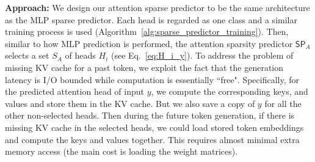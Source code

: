 \textbf{Approach:} We design our attention sparse predictor to be the same architecture as the MLP sparse predictor. Each head is regarded as one class and a similar training process is used (Algorithm~\ref{alg:sparse_predictor_training}). Then, similar to how MLP prediction is performed, the attention sparsity predictor $\mathsf{SP}_A$ selects a set $S_A$ of heads $H_i$ (see Eq.~\eqref{eq:H_i_y}).  To address the problem of missing KV cache for a past token, we exploit the fact that the generation latency is I/O bounded while computation is essentially ``free". Specifically, for the predicted attention head of input $y$, we compute the corresponding keys, and values and store them in the KV cache. But we also save a copy of $y$ for all the other non-selected heads. Then during the future token generation, if there is missing KV cache in the selected heads, we could load stored token embeddings and compute the keys and values together. This requires almost minimal extra memory access (the main cost is loading the weight matrices).

